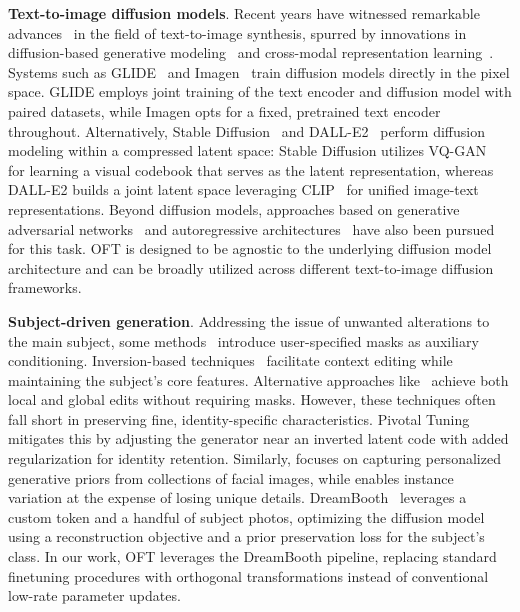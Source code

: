 \textbf{Text-to-image diffusion models}. Recent years have witnessed remarkable advances~\cite{saharia2022photorealistic,ramesh2022hierarchical,rombach2022high,gu2022vector,nichol2022glide} in the field of text-to-image synthesis, spurred by innovations in diffusion-based generative modeling~\cite{ho2020denoising,song2021score,song2021denoising,dhariwal2021diffusion} and cross-modal representation learning~\cite{su2020vlbert,lu2019vilbert,radford2021learning,wang2021simvlm,li2022blip,li2023blip,alayrac2022flamingo,schuhmann2022laion}. Systems such as GLIDE~\cite{nichol2022glide} and Imagen~\cite{saharia2022photorealistic} train diffusion models directly in the pixel space. GLIDE employs joint training of the text encoder and diffusion model with paired datasets, while Imagen opts for a fixed, pretrained text encoder throughout. Alternatively, Stable Diffusion~\cite{rombach2022high} and DALL-E2~\cite{ramesh2022hierarchical} perform diffusion modeling within a compressed latent space: Stable Diffusion utilizes VQ-GAN~\cite{esser2021taming} for learning a visual codebook that serves as the latent representation, whereas DALL-E2 builds a joint latent space leveraging CLIP~\cite{radford2021learning} for unified image-text representations. Beyond diffusion models, approaches based on generative adversarial networks~\cite{reed2016generative,zhang2017stackgan,xu2018attngan,li2019controllable} and autoregressive architectures~\cite{ramesh2021zero,ding2021cogview,wu2022nuwa,yuscaling} have also been pursued for this task. OFT is designed to be agnostic to the underlying diffusion model architecture and can be broadly utilized across different text-to-image diffusion frameworks.

\textbf{Subject-driven generation}. Addressing the issue of unwanted alterations to the main subject, some methods~\cite{avrahami2022blended,nichol2022glide} introduce user-specified masks as auxiliary conditioning. Inversion-based techniques~\cite{choi2021ilvr,dhariwal2021diffusion,ramesh2022hierarchical,gal2022image} facilitate context editing while maintaining the subject's core features. Alternative approaches like~\cite{hertz2022prompt} achieve both local and global edits without requiring masks. However, these techniques often fall short in preserving fine, identity-specific characteristics. Pivotal Tuning~\cite{roich2022pivotal} mitigates this by adjusting the generator near an inverted latent code with added regularization for identity retention. Similarly, \cite{nitzan2022mystyle} focuses on capturing personalized generative priors from collections of facial images, while \cite{casanova2021instance} enables instance variation at the expense of losing unique details. DreamBooth~\cite{ruiz2023dreambooth} leverages a custom token and a handful of subject photos, optimizing the diffusion model using a reconstruction objective and a prior preservation loss for the subject's class. In our work, OFT leverages the DreamBooth pipeline, replacing standard finetuning procedures with orthogonal transformations instead of conventional low-rate parameter updates.

